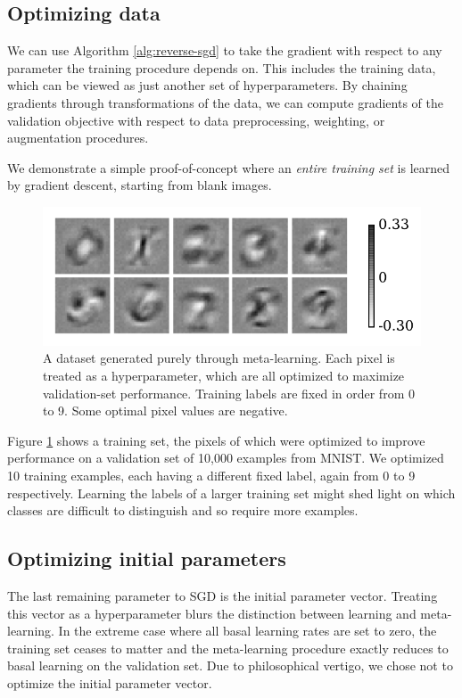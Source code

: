 \documentclass{article}
\newcommand{\primal}{basal}
\begin{document}
\subsection{Optimizing data}

We can use Algorithm \ref{alg:reverse-sgd} to take the gradient with respect to any parameter the training procedure depends on.
This includes the training data, which can be viewed as just another set of hyperparameters.
By chaining gradients through transformations of the data, we can compute gradients of the validation objective with respect to data preprocessing, weighting, or augmentation procedures.

We demonstrate a simple proof-of-concept where an \emph{entire training set} is learned by gradient descent, starting from blank images.
%
\begin{figure}[h!]
\begin{center}
\includegraphics[width=\columnwidth]{../experiments/Jan_19_optimize_data/9_color_bar/fake_data.pdf}
\caption{A dataset generated purely through meta-learning.
Each pixel is treated as a hyperparameter, which are all optimized to maximize validation-set performance.
Training labels are fixed in order from 0 to 9.
Some optimal pixel values are negative.}
\label{fig:fake data}
\end{center}
\end{figure} 
%
Figure \ref{fig:fake data} shows a training set, the pixels of which were optimized to improve performance on a validation set of 10,000 examples from MNIST.
We optimized 10 training examples, each having a different fixed label, again from 0 to 9 respectively.
Learning the labels of a larger training set might shed light on which classes are difficult to distinguish and so require more examples.

\subsection{Optimizing initial parameters}
The last remaining parameter to SGD is the initial parameter vector.
Treating this vector as a hyperparameter blurs the distinction between learning and meta-learning.
In the extreme case where all \primal{} learning rates are set to zero, the training set ceases to matter and the meta-learning procedure exactly reduces to \primal{} learning on the validation set.
Due to philosophical vertigo, we chose not to optimize the initial parameter vector.
\end{document}
